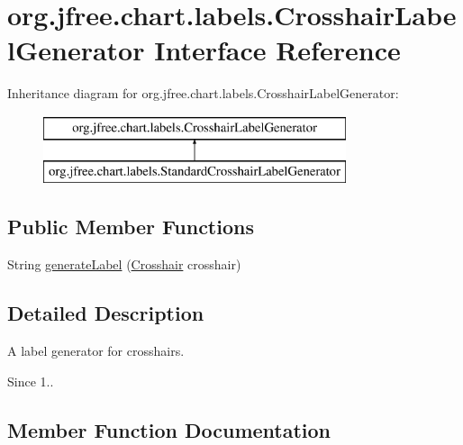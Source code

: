 \hypertarget{interfaceorg_1_1jfree_1_1chart_1_1labels_1_1_crosshair_label_generator}{}\section{org.\+jfree.\+chart.\+labels.\+Crosshair\+Label\+Generator Interface Reference}
\label{interfaceorg_1_1jfree_1_1chart_1_1labels_1_1_crosshair_label_generator}
Inheritance diagram for org.\+jfree.\+chart.\+labels.\+Crosshair\+Label\+Generator\+:\begin{figure}[H]
\begin{center}
\leavevmode
\includegraphics[height=2.000000cm]{interfaceorg_1_1jfree_1_1chart_1_1labels_1_1_crosshair_label_generator}
\end{center}
\end{figure}
\subsection*{Public Member Functions}
\begin{DoxyCompactItemize}
\item 
String \mbox{\hyperlink{interfaceorg_1_1jfree_1_1chart_1_1labels_1_1_crosshair_label_generator_a205b70df5a2ff8c21ee313208cc06f68}{generate\+Label}} (\mbox{\hyperlink{classorg_1_1jfree_1_1chart_1_1plot_1_1_crosshair}{Crosshair}} crosshair)
\end{DoxyCompactItemize}


\subsection{Detailed Description}
A label generator for crosshairs.

\begin{DoxySince}{Since}
1.. 
\end{DoxySince}


\subsection{Member Function Documentation}
\mbox{\label{interfaceorg_1_1jfree_1_1chart_1_1labels_1_1_crosshair_label_generator_a205b70df5a2ff8c21ee313208cc06f68}} 
